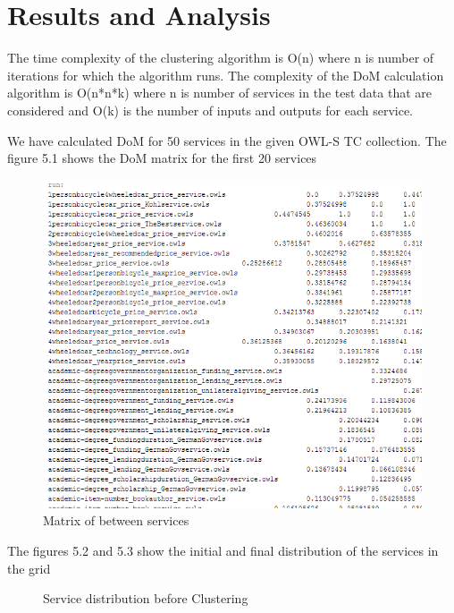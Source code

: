 \documentclass[a4paper,12pt]{article}
\begin{document}
\section{\fontsize{16pt}{1em} Results and Analysis}
The time complexity of the clustering algorithm is O(n) where n is number of iterations for which the algorithm runs. The complexity of the DoM calculation algorithm is O(n*n*k) where n is number of services in the test data that are considered and O(k) is the number of inputs and outputs for each service.

We have calculated DoM for 50 services in the given OWL-S TC collection. The figure 5.1 shows the DoM matrix for the first 20 services
\\
\begin{figure}[htb]
\centering
\includegraphics[scale=1]{./values.jpg}
\caption{Matrix of  between services}
\label{fig:label} 
\end{figure}
The figures 5.2 and 5.3 show the initial and final distribution of the services in the grid
\newpage
\begin{figure}[htb]
\centering

\caption{Service distribution before Clustering}
\label{fig:label} 
\end{figure}
\newpage
\end{document}
